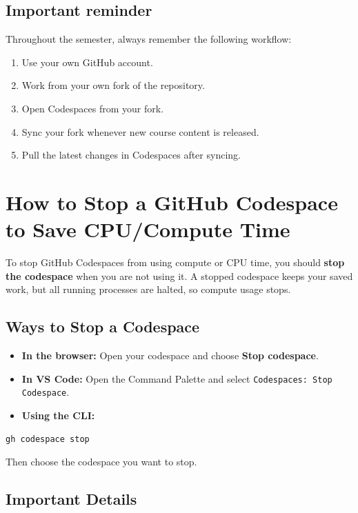 \subsection*{Important reminder}

Throughout the semester, always remember the following workflow:

\begin{enumerate}
    \item Use your own GitHub account.
    \item Work from your own fork of the repository.
    \item Open Codespaces from your fork.
    \item Sync your fork whenever new course content is released.
    \item Pull the latest changes in Codespaces after syncing.
\end{enumerate}

\section*{How to Stop a GitHub Codespace to Save CPU/Compute Time}

To stop GitHub Codespaces from using compute or CPU time, you should \textbf{stop the codespace} when you are not using it. A stopped codespace keeps your saved work, but all running processes are halted, so compute usage stops.

\subsection*{Ways to Stop a Codespace}

\begin{itemize}
    \item \textbf{In the browser:} Open your codespace and choose \textbf{Stop codespace}.
    \item \textbf{In VS Code:} Open the Command Palette and select \texttt{Codespaces: Stop Codespace}.
    \item \textbf{Using the CLI:}
\end{itemize}

\begin{verbatim}
gh codespace stop
\end{verbatim}

Then choose the codespace you want to stop.

\subsection*{Important Details}

